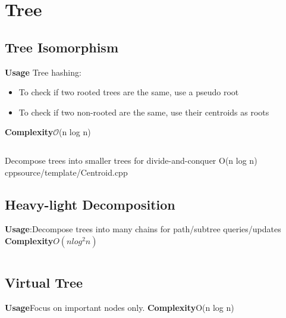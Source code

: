 \section{Tree}
\subsection{Tree Isomorphism}
\textbf{Usage} Tree hashing:
 \begin{itemize}
 \item To check if two rooted trees are the same, use a pseudo root
 \item To check if two non-rooted are the same, use their centroids as roots
 \end{itemize}
\textbf{Complexity}$\mathcal{O}$(n log n)
\inputminted[]{cpp}{source/template/Isomorphism.cpp}


{Decompose trees into smaller trees for divide-and-conquer}
{O(n log n)}
{cpp}{source/template/Centroid.cpp}


\subsection{Heavy-light Decomposition}
\textbf{Usage}:Decompose trees into many chains for path/subtree queries/updates
\textbf{Complexity}$O(n log^2 n)$
\inputminted[]{cpp}{source/template/HLD.cpp}


\subsection{Virtual Tree}
\textbf{Usage}Focus on important nodes only.
\textbf{Complexity}O(n log n)
\inputminted[]{cpp}{source/template/VirtualTree.cpp}